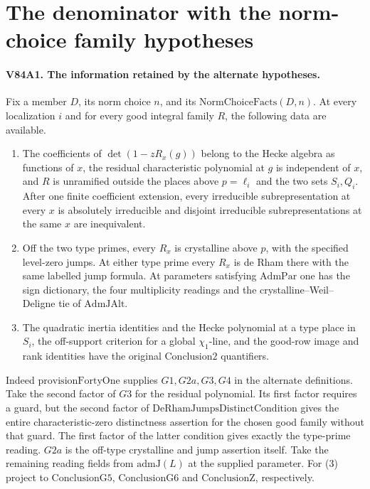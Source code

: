 \section{The denominator with the norm-choice family hypotheses}

\paragraph{V84A1. The information retained by the alternate hypotheses.}
Fix a member $D$, its norm choice $n$, and its
$\mathrm{NormChoiceFacts}(D,n)$. At every localization $i$ and for
every good integral family $R$, the following data are available.
\begin{enumerate}
\item The coefficients of $\det(1-zR_x(g))$ belong to the Hecke
algebra as functions of $x$, the residual characteristic polynomial
at $g$ is independent of $x$, and $R$ is unramified outside the
places above $p=\ell_i$ and the two sets $S_i,Q_i$. After one finite
coefficient extension, every irreducible subrepresentation at every
$x$ is absolutely irreducible and disjoint irreducible
subrepresentations at the same $x$ are inequivalent.
\item Off the two type primes, every $R_x$ is crystalline above $p$,
with the specified level-zero jumps. At either type prime every
$R_x$ is de Rham there with the same labelled jump formula.
At parameters satisfying $\mathrm{AdmPar}$ one has the sign
dictionary, the four multiplicity readings and the
crystalline--Weil--Deligne tie of $\mathrm{AdmJAlt}$.
\item The quadratic inertia identities and the Hecke polynomial at
a type place in $S_i$, the off-support criterion for a global
$\chi_1$-line, and the good-row image and rank identities have
the original $\mathrm{Conclusion2}$ quantifiers.
\end{enumerate}
Indeed $\mathrm{provisionFortyOne}$ supplies $G1,G2a,G3,G4$ in the
alternate definitions. Take the second factor of $G3$ for the
residual polynomial. Its first factor requires a guard, but the
second factor of $\mathrm{DeRhamJumpsDistinctCondition}$ gives
the entire characteristic-zero distinctness assertion for the
chosen good family without that guard. The first factor of the
latter condition gives exactly the type-prime reading. $G2a$ is
the off-type crystalline and jump assertion itself. Take the
remaining reading fields from $\mathrm{admJ}(L)$ at the supplied
parameter. For (3) project to $\mathrm{ConclusionG5}$,
$\mathrm{ConclusionG6}$ and $\mathrm{ConclusionZ}$, respectively.

